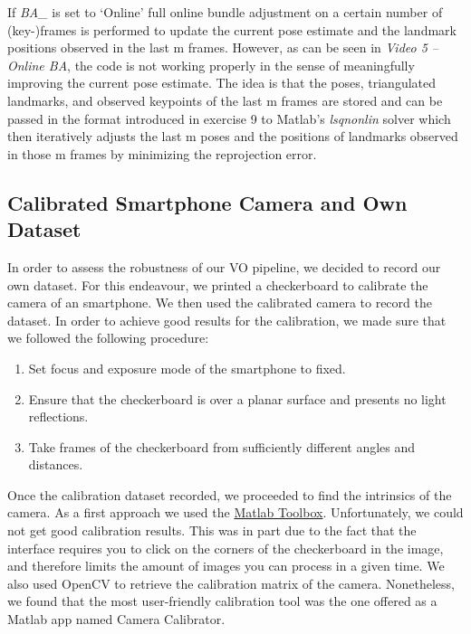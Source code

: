 If \textit{BA\_} is set to ‘Online’ full online bundle adjustment on a certain number of (key-)frames is performed to update the current pose estimate and the landmark positions observed in the last m frames. However, as can be seen in \textit{Video 5 – Online BA}, the code is not working properly in the sense of meaningfully improving the current pose estimate. The idea is that the poses, triangulated landmarks, and observed keypoints of the last m frames are stored and can be passed in the format introduced in exercise 9 to Matlab’s \textit{lsqnonlin} solver which then iteratively adjusts the last m poses and the positions of landmarks observed in those m frames by minimizing the reprojection error.  



\subsection{Calibrated Smartphone Camera and Own Dataset}

In order to assess the robustness of our VO pipeline, we decided to record our own dataset.
For this endeavour, we printed a checkerboard to calibrate the camera of an smartphone.
We then used the calibrated camera to record the dataset.
In order to achieve good results for the calibration, we made sure that we followed the following procedure:

\begin{enumerate}
	\item Set focus and exposure mode of the smartphone to fixed.
	\item Ensure that the checkerboard is over a planar surface and presents no light reflections.
	\item Take frames of the checkerboard from sufficiently different angles and distances.
\end{enumerate}

Once the calibration dataset recorded, we proceeded to find the intrinsics of the camera.
As a first approach we used the \href{https://www.vision.caltech.edu/bouguetj/calib_doc/}{Matlab Toolbox}.
Unfortunately, we could not get good calibration results.
This was in part due to the fact that the interface requires you to click on the
corners of the checkerboard in the image, and therefore limits the amount of images you can process in a given time.
We also used OpenCV to retrieve the calibration matrix of the camera. Nonetheless, we found that the most user-friendly
calibration tool was the one offered as a Matlab app named Camera Calibrator.

